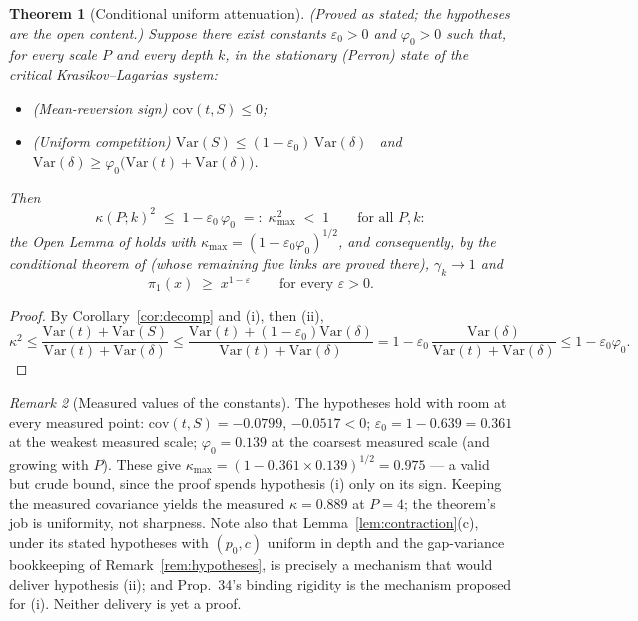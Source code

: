 \documentclass[11pt]{article}
\newtheorem{theorem}{Theorem}
\theoremstyle{definition}
\theoremstyle{remark}
\newtheorem{remark}[theorem]{Remark}
\newcommand{\Var}{\mathrm{Var}}
\newcommand{\cov}{\mathrm{cov}}
\newcommand{\gam}{\gamma}
\newcommand{\kap}{\kappa}
\newcommand{\dl}{\delta}
\begin{document}
\begin{theorem}[Conditional uniform attenuation]
\label{thm:main}
\textup{(Proved as stated; the hypotheses are the open content.)}
Suppose there exist constants $\varepsilon_0 > 0$ and $\varphi_0 > 0$
such that, for every scale $P$ and every depth $k$, in the stationary
(Perron) state of the critical Krasikov--Lagarias system:
\begin{itemize}
\item[(i)] \emph{(Mean-reversion sign)} $\cov(t, S) \leq 0$;
\item[(ii)] \emph{(Uniform competition)}
$\Var(S) \leq (1 - \varepsilon_0)\,\Var(\dl)$ \ and \
$\Var(\dl) \geq \varphi_0 \big( \Var(t) + \Var(\dl) \big)$.
\end{itemize}
Then
\[
\kap(P; k)^2 \;\leq\; 1 - \varepsilon_0\,\varphi_0 \;=:\; \kap_{\max}^2
\;<\; 1
\qquad \text{for all } P, k :
\]
the Open Lemma of \cite{Drift26, Gamma26} holds with
$\kap_{\max} = (1 - \varepsilon_0 \varphi_0)^{1/2}$, and consequently, by
the conditional theorem of \cite{Gamma26} (whose remaining five links are
proved there), $\gam_k \to 1$ and
\[
\pi_1(x) \;\geq\; x^{1 - \varepsilon}
\qquad \text{for every } \varepsilon > 0 .
\]
\end{theorem}

\begin{proof}
By Corollary~\ref{cor:decomp} and (i), then (ii),
\[
\kap^2 \leq \frac{\Var(t) + \Var(S)}{\Var(t) + \Var(\dl)}
\leq \frac{\Var(t) + (1 - \varepsilon_0)\Var(\dl)}{\Var(t) + \Var(\dl)}
= 1 - \varepsilon_0 \,\frac{\Var(\dl)}{\Var(t) + \Var(\dl)}
\leq 1 - \varepsilon_0 \varphi_0 .
\]
\end{proof}

\begin{remark}[Measured values of the constants]
The hypotheses hold with room at every measured point:
$\cov(t,S) = -0.0799$, $-0.0517 < 0$;
$\varepsilon_0 = 1 - 0.639 = 0.361$ at the weakest measured scale;
$\varphi_0 = 0.139$ at the coarsest measured scale (and growing with
$P$). These give $\kap_{\max} = (1 - 0.361 \times 0.139)^{1/2} = 0.975$
--- a valid but crude bound, since the proof spends hypothesis (i) only
on its sign. Keeping the measured covariance yields the measured
$\kap = 0.889$ at $P = 4$; the theorem's job is uniformity, not
sharpness. Note also that Lemma~\ref{lem:contraction}(c), under its
stated hypotheses with $(p_0, c)$ uniform in depth and the gap-variance
bookkeeping of Remark~\ref{rem:hypotheses}, is precisely a mechanism
that would deliver hypothesis (ii); and Prop.~34's binding rigidity
\cite{NOTE} is the mechanism proposed for (i). Neither delivery is yet a
proof.
\end{remark}
\end{document}
